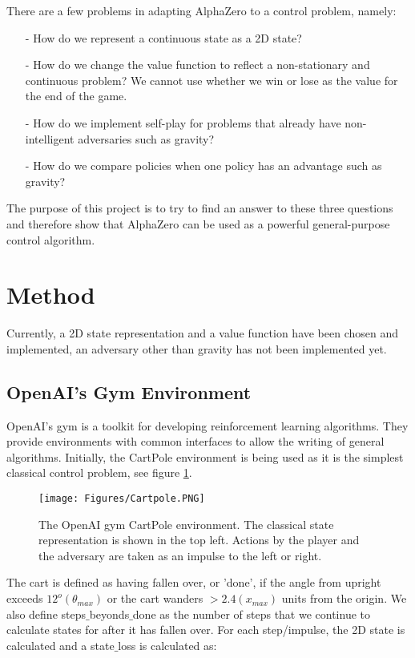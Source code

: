 \documentclass[11.7pt]{article}
\begin{document}
There are a few problems in adapting AlphaZero to a control problem, namely:
\begin{itemize}
   \item[-] How do we represent a continuous state as a 2D state?
   \item[-] How do we change the value function to reflect a non-stationary and continuous problem? We cannot use whether we win or lose as the value for the end of the game.
   \item[-] How do we implement self-play for problems that already have non-intelligent adversaries such as gravity?
   \item[-] How do we compare policies when one policy has an advantage such as gravity? 
\end{itemize}

The purpose of this project is to try to find an answer to these three questions and therefore show that AlphaZero can be used as a powerful general-purpose control algorithm.

\section{Method}

Currently, a 2D state representation and a value function have been chosen and implemented, an adversary other than gravity has not been implemented yet.

\subsection{OpenAI's Gym Environment}

OpenAI's gym is a toolkit for developing reinforcement learning algorithms. They provide environments with common interfaces to allow the writing of general algorithms. Initially, the CartPole environment is being used as it is the simplest classical control problem, see figure \ref{fig:cartpole}.

\begin{figure}[H]
   \centering
   \texttt{[image: Figures/Cartpole.PNG]}
   \caption{\label{fig:cartpole} The OpenAI gym CartPole environment. The classical state representation is shown in the top left. Actions by the player and the adversary are taken as an impulse to the left or right.}
\end{figure}

The cart is defined as having fallen over, or 'done', if the angle from upright exceeds $12^o (\theta_{max})$ or the cart wanders $> 2.4 (x_{max})$ units from the origin. We also define steps$\_$beyonds$\_$done as the number of steps that we continue to calculate states for after it has fallen over. For each step/impulse, the 2D state is calculated and a state$\_$loss is calculated as:
\end{document}
